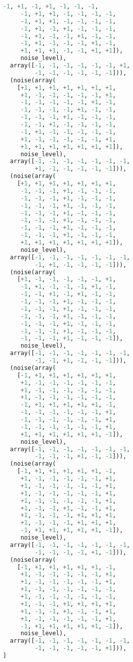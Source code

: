 \documentclass{article}
\begin{document}
\begin{lstlisting}[language=Python]
     -1, +1, -1, +1, -1, -1, -1,
     -1, +1, +1, -1, -1, -1, -1, 
     -1, +1, +1, -1, -1, -1, -1, 
     -1, +1, -1, +1, -1, -1, -1,
     -1, +1, -1, -1, +1, -1, -1, 
     -1, +1, -1, -1, -1, +1, -1, 
     +1, +1, +1, -1, -1, +1, +1]), 
     noise_level),
  array([-1, -1, -1, -1, -1, -1, +1, 
         -1, -1, -1, -1, -1, -1])),
  (noise(array(
    [+1, +1, +1, +1, +1, +1, +1, 
     +1, -1, -1, -1, -1, -1, +1, 
     -1, -1, -1, -1, -1, +1, -1, 
     -1, -1, -1, -1, +1, -1, -1, 
     -1, -1, -1, +1, -1, -1, -1, 
     -1, -1, +1, -1, -1, -1, -1, 
     -1, +1, -1, -1, -1, -1, -1, 
     +1, -1, -1, -1, -1, -1, +1, 
     +1, +1, +1, +1, +1, +1, +1]), 
     noise_level),
  array([-1, -1, -1, -1, -1, -1, -1, 
         +1, -1, -1, -1, -1, -1])),
  (noise(array(
    [+1, +1, +1, +1, +1, +1, +1, 
     -1, -1, -1, +1, -1, -1, -1, 
     -1, -1, -1, +1, -1, -1, -1,
     -1, -1, -1, +1, -1, -1, -1, 
     -1, -1, -1, +1, -1, -1, -1, 
     -1, -1, -1, +1, -1, -1, -1, 
     -1, -1, -1, +1, -1, -1, -1, 
     -1, -1, -1, +1, -1, -1, -1, 
     +1, +1, +1, +1, +1, +1, +1]), 
     noise_level),
  array([-1, -1, -1, -1, -1, -1, -1, 
         -1, +1, -1, -1, -1, -1])),
  (noise(array(
    [+1, -1, -1, -1, -1, -1, +1, 
     -1, +1, -1, -1, -1, +1, -1, 
     -1, -1, +1, -1, +1, -1, -1,
     -1, -1, -1, +1, -1, -1, -1, 
     -1, -1, -1, +1, -1, -1, -1, 
     -1, -1, -1, +1, -1, -1, -1, 
     -1, -1, -1, +1, -1, -1, -1, 
     -1, -1, -1, +1, -1, -1, -1, 
     -1, -1, -1, +1, -1, -1, -1]), 
     noise_level),
  array([-1, -1, -1, -1, -1, -1, -1, 
         -1, -1, +1, -1, -1, -1])),
  (noise(array(
    [-1, +1, +1, +1, +1, +1, +1, 
     +1, -1, -1, -1, -1, -1, -1, 
     +1, -1, -1, -1, -1, -1, -1, 
     +1, -1, -1, -1, -1, -1, -1, 
     -1, +1, +1, +1, +1, +1, -1, 
     -1, -1, -1, -1, -1, -1, +1, 
     -1, -1, -1, -1, -1, -1, +1, 
     -1, -1, -1, -1, -1, -1, +1, 
     +1, +1, +1, +1, +1, +1, -1]), 
     noise_level),
  array([-1, -1, -1, -1, -1, -1, -1, 
         -1, -1, -1, +1, -1, -1])),
  (noise(array(
    [-1, +1, +1, +1, +1, +1, -1, 
     +1, -1, -1, -1, -1, -1, +1, 
     +1, -1, -1, -1, -1, -1, +1, 
     +1, -1, -1, -1, -1, -1, +1, 
     +1, -1, -1, -1, -1, -1, +1, 
     +1, -1, -1, +1, -1, -1, +1, 
     +1, -1, -1, -1, +1, +1, +1, 
     +1, -1, -1, -1, +1, +1, +1, 
     -1, +1, +1, +1, +1, +1, -1]), 
     noise_level),
  array([-1, -1, -1, -1, -1, -1, -1, 
         -1, -1, -1, -1, +1, -1])),
  (noise(array(
    [-1, +1, +1, +1, +1, +1, -1, 
     +1, -1, -1, -1, -1, -1, +1, 
     +1, -1, -1, -1, -1, -1, +1, 
     +1, -1, -1, -1, -1, -1, -1, 
     +1, -1, -1, -1, -1, -1, -1, 
     +1, -1, -1, +1, +1, +1, +1, 
     +1, -1, -1, +1, -1, -1, +1, 
     +1, -1, -1, -1, -1, -1, +1, 
     -1, +1, +1, +1, +1, +1, -1]),
     noise_level),
  array([-1, -1, -1, -1, -1, -1, -1, 
         -1, -1, -1, -1, -1, +1])),
]


\end{lstlisting}
\end{document}
